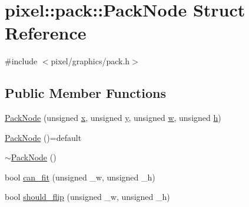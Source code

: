 \hypertarget{structpixel_1_1pack_1_1_pack_node}{}\section{pixel\+:\+:pack\+:\+:Pack\+Node Struct Reference}
\label{structpixel_1_1pack_1_1_pack_node}


{\ttfamily \#include $<$pixel/graphics/pack.\+h$>$}

\subsection*{Public Member Functions}
\begin{DoxyCompactItemize}
\item 
\hyperlink{structpixel_1_1pack_1_1_pack_node_aa878a4442b6d942b8f7fc83e75244dcd}{Pack\+Node} (unsigned \hyperlink{structpixel_1_1pack_1_1_pack_node_a6354ce26408343f8285102c6457e2ad0}{x}, unsigned \hyperlink{structpixel_1_1pack_1_1_pack_node_a5f7655b61750b69345416a77ee2138cb}{y}, unsigned \hyperlink{structpixel_1_1pack_1_1_pack_node_af54e70dd691d64ac8696dc353a53de72}{w}, unsigned \hyperlink{structpixel_1_1pack_1_1_pack_node_a380024626a85cde82d459a86e79c7651}{h})
\item 
\hyperlink{structpixel_1_1pack_1_1_pack_node_a8b2fde54fe2e46cc591f46e77b2fd0ad}{Pack\+Node} ()=default
\item 
\hyperlink{structpixel_1_1pack_1_1_pack_node_a8ce9fffbc415ea9509106959c99421fc}{$\sim$\+Pack\+Node} ()
\item 
bool \hyperlink{structpixel_1_1pack_1_1_pack_node_a106addb740c67e52ea781ecbfb778d22}{can\+\_\+fit} (unsigned \+\_\+w, unsigned \+\_\+h)
\item 
bool \hyperlink{structpixel_1_1pack_1_1_pack_node_a6c8bdca8866f0a2e19c9a9f2a65cff38}{should\+\_\+flip} (unsigned \+\_\+w, unsigned \+\_\+h)
\end{DoxyCompactItemize}
